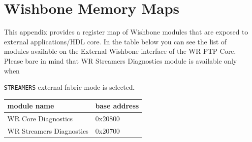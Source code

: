 \documentclass[a4paper, 12pt]{article}
\renewcommand{\_}{\underscore\allowbreak}
\newcommand{\tts}[1]{
  \texttt{\small{#1}}}
\begin{document}
\newpage
\section{Wishbone Memory Maps}
\label{sec:wb_mem_maps}

This appendix provides a register map of Wishbone modules that are exposed to
external applications/HDL core. In the table below you can see the list of
modules available on the External Wishbone interface of the WR PTP Core. Please
bare in mind that WR Streamers Diagnostics module is available only when
\tts{STREAMERS} external fabric mode is selected.
\begin{center}
\begin{tabular}{|l|l|}
  \hline
  module name & base address\\
  \hline \hline
  WR Core Diagnostics & 0x20800\\
  WR Streamers Diagnostics & 0x20700\\
  \hline
\end{tabular}
\end{center}


\newpage

\end{document}
